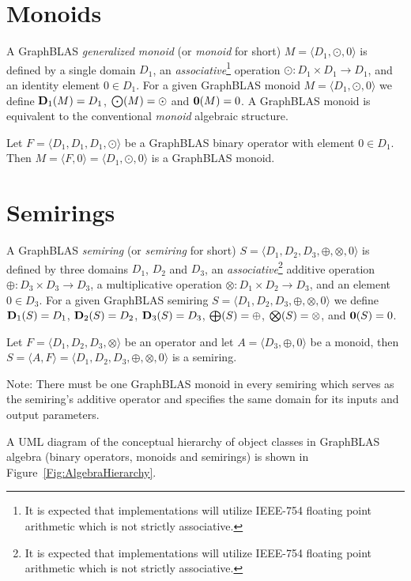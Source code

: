 \section{Monoids}

A GraphBLAS \emph{generalized monoid} (or \emph{monoid} for short) $M =
\langle D_1,\odot,0 \rangle$ is defined by a single domain $D_1$, an 
\emph{associative}\footnote{It is expected that implementations 
will utilize IEEE-754 floating point arithmetic which is not 
strictly associative.} 
operation $\odot: D_1 \times D_1 \rightarrow D_1$,
and an identity element $0 \in D_1$.  For a given GraphBLAS monoid $M=\langle
D_1,\odot,0 \rangle$ we define $\bold{D}_1(M) = D_1$, $\bold{\bigodot}(M) =
\odot$ and $\bold{0}(M) = 0$.  A GraphBLAS monoid is equivalent to 
the conventional \emph{monoid} algebraic structure.

Let $F = \langle D_1,D_1,D_1,\odot \rangle$ be a GraphBLAS binary operator
with element $0 \in D_1$.  Then $M = \langle F,0 \rangle = \langle
D_1,\odot,0 \rangle$ is a GraphBLAS monoid.

\section{Semirings}

A GraphBLAS \emph{semiring} (or \emph{semiring} for short)
$S=\langle D_1,D_2,D_3,\oplus,\otimes,0 \rangle$ is defined by
three domains $D_1$, $D_2$ and $D_3$, an \emph{associative}\footnote{It 
is expected that implementations will utilize IEEE-754 floating 
point arithmetic which is not strictly associative.} 
additive operation $\oplus : D_3 \times D_3 \rightarrow D_3$, 
a multiplicative operation $\otimes : D_1 \times D_2 \rightarrow
D_3$, and an element $0 \in D_3$.
For a given GraphBLAS semiring $S=\langle D_1,
D_2, D_3,\oplus,\otimes,0 \rangle$ we define $\bold{D}_1(S) = D_1$,
$\bold{D}_2(S) = D_2$, $\bold{D}_3(S) = D_3$, $\bold{\bigoplus}(S) =
\oplus$, $\bold{\bigotimes}(S) = \otimes$, and ${\bf 0}(S) = 0$. 

Let $F = \langle D_1,D_2,D_3,\otimes \rangle$ be an operator
and let $A = \langle D_3,\oplus,0 \rangle$ be a monoid,
then $S= \langle A,F \rangle = \langle D_1,D_2,D_3,\oplus,\otimes,0 \rangle$
is a semiring.

Note: There must be one GraphBLAS monoid in every semiring which 
serves as the semiring's additive operator and  
specifies the same domain for its inputs and output parameters. 

A UML diagram of the conceptual hierarchy of object classes in GraphBLAS
algebra (binary operators, monoids and semirings) is shown in 
Figure~\ref{Fig:AlgebraHierarchy}.

